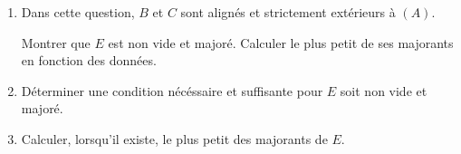 \documentclass[a4paper,12pt]{article}
\begin{document}
\medskip

\begin{enumerate}
\item Dans cette question, $B$ et $C$ sont alignés et strictement extérieurs à $(A)$.

Montrer que $E$ est non vide et majoré.
	Calculer le plus petit de ses majorants en fonction des données.
\item Déterminer une condition nécéssaire et suffisante pour $E$ soit non
	vide et majoré.
\item Calculer, lorsqu'il existe, le plus petit des majorants de $E$.
\end{enumerate}
\end{document}

